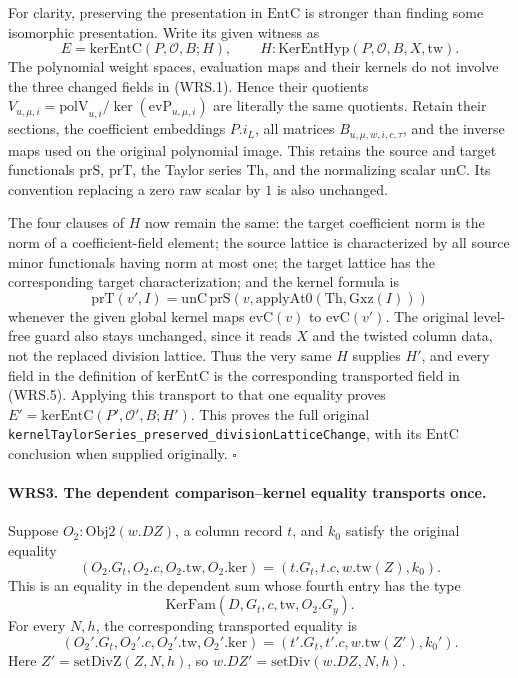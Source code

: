\documentclass[11pt,a4paper]{article}
\numberwithin{equation}{section}
\theoremstyle{remark}\newtheorem{remark}[theorem]{Remark}
\begin{document}
For clarity, preserving the presentation in \(\mathrm{EntC}\) is
stronger than finding some isomorphic presentation.  Write its given
witness as
\[
 E=\mathrm{kerEntC}(P,\mathcal O,B;H),
 \qquad H:\mathrm{KerEntHyp}(P,\mathcal O,B,X,\mathrm{tw}).
 \tag{WRS.5}
\]
The polynomial weight spaces, evaluation maps and their kernels do
not involve the three changed fields in (WRS.1).  Hence their quotients
\(V_{u,\mu,i}=\mathrm{polV}_{u,i}/\ker(\mathrm{evP}_{u,\mu,i})\)
are literally the same quotients.  Retain their sections, the
coefficient embeddings \(P.i_L\), all matrices \(B_{u,\mu,w,i,c,\tau}\),
and the inverse maps used on the original polynomial image.  This
retains the source and target functionals \(\mathrm{prS}\),
\(\mathrm{prT}\), the Taylor series \(\mathrm{Th}\), and the
normalizing scalar \(\mathrm{unC}\).  Its convention replacing a
zero raw scalar by \(1\) is also unchanged.

The four clauses of \(H\) now remain the same: the target
coefficient norm is the norm of a coefficient-field element; the
source lattice is characterized by all source minor functionals
having norm at most one; the target lattice has the corresponding
target characterization; and the kernel formula is
\[
 \mathrm{prT}(v',I)=\mathrm{unC}\,
 \mathrm{prS}\!\left(v,
       \mathrm{applyAt0}(\mathrm{Th},\mathrm{Gxz}(I))\right)
 \tag{WRS.6}
\]
whenever the given global kernel maps \(\mathrm{evC}(v)\) to
\(\mathrm{evC}(v')\).  The original level-free guard also stays
unchanged, since it reads \(X\) and the twisted column data, not
the replaced division lattice.  Thus the very same \(H\) supplies
\(H'\), and every field in the definition of \(\mathrm{kerEntC}\)
is the corresponding transported field in (WRS.5).
Applying this transport to that one equality proves
\(E'=\mathrm{kerEntC}(P',\mathcal O',B;H')\).
This proves the full original
\texttt{kernel\allowbreak Taylor\allowbreak Series\_\allowbreak preserved\_\allowbreak division\allowbreak Lattice\allowbreak Change},
with its \(\mathrm{EntC}\) conclusion when supplied originally.
\hfill\(\square\)

\paragraph{WRS3. The dependent comparison--kernel equality transports once.}
\label{claim:WRS3}
Suppose \(O_2:\mathrm{Obj2}(w.DZ)\), a column record \(t\), and
\(k_0\) satisfy the original equality
\[
 (O_2.G_t,O_2.c,O_2.\mathrm{tw},O_2.\mathrm{ker})
    =(t.G_t,t.c,w.\mathrm{tw}(Z),k_0).                \tag{WRS.7}
\]
This is an equality in the dependent sum whose fourth entry has
the type
\[
              \mathrm{KerFam}(D,G_t,c,\mathrm{tw},O_2.G_y).
\]
For every \(N,h\), the corresponding transported equality is
\[
 (O_2'.G_t,O_2'.c,O_2'.\mathrm{tw},O_2'.\mathrm{ker})
    =(t'.G_t,t'.c,w.\mathrm{tw}(Z'),k_0').            \tag{WRS.8}
\]
Here \(Z'=\mathrm{setDivZ}(Z,N,h)\), so
\(w.DZ'=\mathrm{setDiv}(w.DZ,N,h)\).
\end{document}
